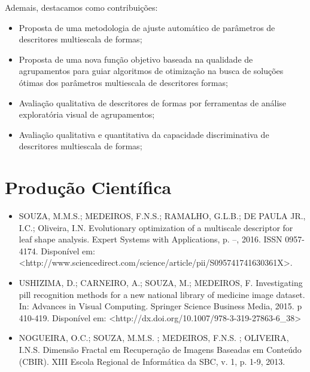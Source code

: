 Ademais, destacamos como contribuições:

\begin{itemize}

\item Proposta de uma metodologia de ajuste automático de parâmetros de descritores multiescala de formas;

\item Proposta de uma nova função objetivo baseada na qualidade de agrupamentos para guiar  algoritmos de otimização na busca de soluções ótimas dos parâmetros multiescala de descritores formas; 

\item Avaliação qualitativa de descritores de formas por ferramentas de análise exploratória visual de agrupamentos;

\item Avaliação qualitativa e quantitativa da capacidade discriminativa de descritores multiescala de formas;

\end{itemize}



\section {Produção Científica \label{sec:prod_cientif}}
\begin{itemize}

\item SOUZA, M.M.S.; MEDEIROS, F.N.S.; RAMALHO, G.L.B.; DE PAULA JR., I.C.; Oliveira, I.N. Evolutionary optimization of a multiscale descriptor for leaf
shape analysis. Expert Systems with Applications, p. –, 2016. ISSN 0957-4174. Disponível
em: <http://www.sciencedirect.com/science/article/pii/S095741741630361X>.

\item USHIZIMA, D.; CARNEIRO, A.; SOUZA, M.; MEDEIROS, F. Investigating pill recognition methods for a new national library of
medicine image dataset. In: Advances in Visual Computing. Springer Science Business Media, 2015. p 410-419. Disponível em: <http://dx.doi.org/10.1007/978-3-319-27863-6\_38>


\item NOGUEIRA, O.C.; SOUZA, M.M.S. ; MEDEIROS, F.N.S. ; OLIVEIRA, I.N.S. Dimensão Fractal em Recuperação de Imagens Baseadas em Conteúdo (CBIR). XIII Escola Regional de Informática da SBC, v. 1, p. 1-9, 2013.

\end{itemize}
